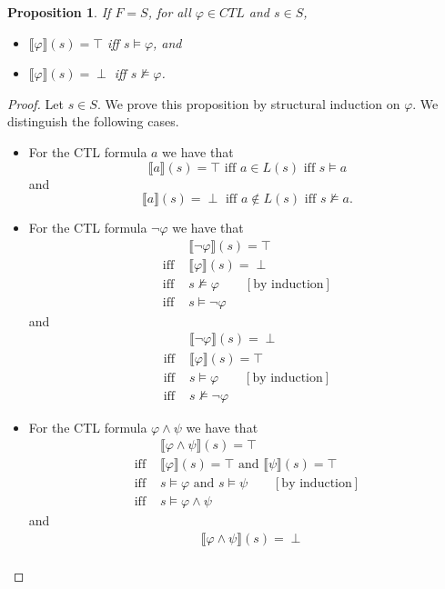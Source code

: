 \documentclass[12pt]{article}
\newtheorem{proposition}{Proposition}
\theoremstyle{definition}
\newcommand{\comment}[1]{\hspace{2em}[\mbox{#1}]}
\newcommand{\satisfaction}[1]{\llbracket #1 \rrbracket}
\begin{document}
\begin{proposition}
If $F = S$, for all $\varphi \in \mathit{CTL}$ and $s \in S$, 
\begin{itemize}
\item
$\satisfaction{\varphi}(s) = \top$ iff $s \models \varphi$, and
\item
$\satisfaction{\varphi}(s) = \perp$ iff $s \not\models \varphi$.
\end{itemize}
\end{proposition}
\begin{proof}
Let $s \in S$.  We prove this proposition by structural induction on $\varphi$.  We distinguish the following cases.
\begin{itemize}
\item 
For the CTL formula $a$ we have that
\[
\satisfaction{a}(s) = \top \mbox{ iff } a \in L(s) \mbox{ iff } s \models a
\]
and
\[
\satisfaction{a}(s) = \perp \mbox{ iff } a \not\in L(s) \mbox{ iff } s \not\models a.
\]
\item
For the CTL formula $\neg \varphi$ we have that
\begin{align*}
& \satisfaction{\neg \varphi}(s) = \top\\
\mbox{iff } & \satisfaction{\varphi}(s) = \perp\\
\mbox{iff } & s \not\models \varphi 
\comment{by induction}\\
\mbox{iff } & s \models \neg \varphi 
\end{align*}
and
\begin{align*}
& \satisfaction{\neg \varphi}(s) = \perp\\
\mbox{iff } & \satisfaction{\varphi}(s) = \top\\
\mbox{iff } & s \models \varphi 
\comment{by induction}\\
\mbox{iff } & s \not\models \neg \varphi 
\end{align*}
\item
For the CTL formula $\varphi \wedge \psi$ we have that
\begin{align*}
& \satisfaction{\varphi \wedge \psi}(s) = \top\\
\mbox{iff } & \satisfaction{\varphi}(s) = \top \mbox{ and } \satisfaction{\psi}(s) = \top\\
\mbox{iff } & s \models \varphi \mbox{ and }  s \models \psi
\comment{by induction}\\
\mbox{iff } & s \models \varphi \wedge \psi
\end{align*}
and
\begin{align*}
& \satisfaction{\varphi \wedge \psi}(s) = \perp\\

\end{align*}
\end{itemize}
\end{proof}
\end{document}
